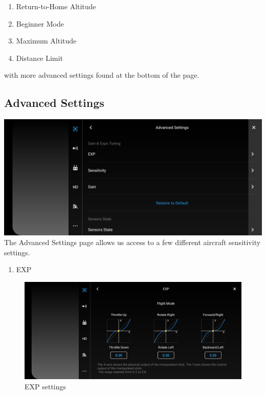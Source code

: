 \documentclass[
]{book}
\providecommand{\tightlist}{%
  \setlength{\itemsep}{0pt}\setlength{\parskip}{0pt}}
\begin{document}
\begin{enumerate}
\def\labelenumi{\arabic{enumi}.}
\tightlist
\item
  Return-to-Home Altitude
\item
  Beginner Mode
\item
  Maximum Altitude
\item
  Distance Limit
\end{enumerate}

with more advanced settings found at the bottom of the page.

\hypertarget{advanced-settings}{%
\subsection{Advanced Settings}\label{advanced-settings}}

\includegraphics{images/MC/DJI-MC-Advanced-Settings.jpg}
The Advanced Settings page allows us access to a few different aircraft sensitivity settings.

\begin{enumerate}
\def\labelenumi{\arabic{enumi}.}
\tightlist
\item
  EXP
\end{enumerate}

\begin{figure}
\centering
\includegraphics{images/MC/DJI-ExpSettings.jpg}
\caption{EXP settings}
\end{figure}
\end{document}
